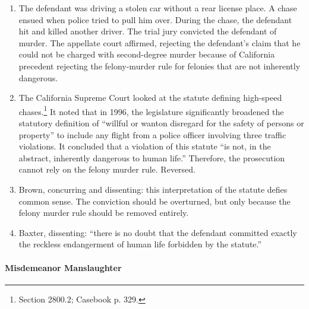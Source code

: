 \begin{enumerate}
    \item The defendant was driving a stolen car without a rear license place. A chase ensued when police tried to pull him over. During the chase, the defendant hit and killed another driver. The trial jury convicted the defendant of murder. The appellate court affirmed, rejecting the defendant's claim that he could not be charged with second-degree murder because of California precedent rejecting the felony-murder rule for felonies that are not inherently dangerous.
    \item The California Supreme Court looked at the statute defining high-speed chases.\footnote{Section 2800.2; Casebook p. 329.} It noted that in 1996, the legislature significantly broadened the statutory definition of ``willful or wanton disregard for the safety of persons or property'' to include any flight from a police officer involving three traffic violations. It concluded that a violation of this statute ``is not, in the abstract, inherently dangerous to human life.'' Therefore, the prosecution cannot rely on the felony murder rule. Reversed.
    \item Brown, concurring and dissenting: this interpretation of the statute defies common sense. The conviction should be overturned, but only because the felony murder rule should be removed entirely.
    \item Baxter, dissenting: ``there is no doubt that the defendant committed exactly the reckless endangerment of human life forbidden by the statute.''
\end{enumerate}



\paragraph{Misdemeanor Manslaughter}

